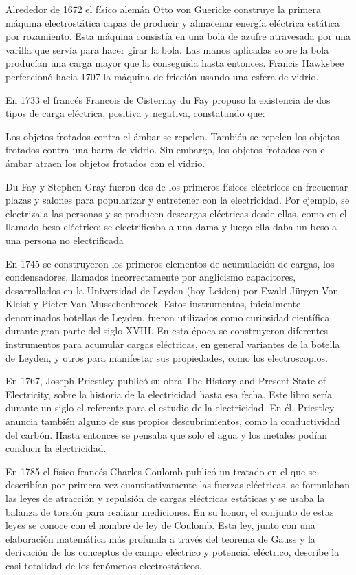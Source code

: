 Alrededor de 1672 el físico alemán Otto von Guericke construye la primera máquina electrostática capaz de producir y almacenar energía eléctrica estática por rozamiento. Esta máquina consistía en una bola de azufre atravesada por una varilla que servía para hacer girar la bola. Las manos aplicadas sobre la bola producían una carga mayor que la conseguida hasta entonces. Francis Hawksbee perfeccionó hacia 1707 la máquina de fricción usando una esfera de vidrio.

En 1733 el francés Francois de Cisternay du Fay propuso la existencia de dos tipos de carga eléctrica, positiva y negativa, constatando que:

Los objetos frotados contra el ámbar se repelen.
También se repelen los objetos frotados contra una barra de vidrio.
Sin embargo, los objetos frotados con el ámbar atraen los objetos frotados con el vidrio.

Du Fay y Stephen Gray fueron dos de los primeros físicos eléctricos en frecuentar plazas y salones para popularizar y entretener con la electricidad. Por ejemplo, se electriza a las personas y se producen descargas eléctricas desde ellas, como en el llamado beso eléctrico: se electrificaba a una dama y luego ella daba un beso a una persona no electrificada

En 1745 se construyeron los primeros elementos de acumulación de cargas, los condensadores, llamados incorrectamente por anglicismo capacitores, desarrollados en la Universidad de Leyden (hoy Leiden) por Ewald Jürgen Von Kleist y Pieter Van Musschenbroeck. Estos instrumentos, inicialmente denominados botellas de Leyden, fueron utilizados como curiosidad científica durante gran parte del siglo XVIII. En esta época se construyeron diferentes instrumentos para acumular cargas eléctricas, en general variantes de la botella de Leyden, y otros para manifestar sus propiedades, como los electroscopios.

En 1767, Joseph Priestley publicó su obra The History and Present State of Electricity, sobre la historia de la electricidad hasta esa fecha. Este libro sería durante un siglo el referente para el estudio de la electricidad. En él, Priestley anuncia también alguno de sus propios descubrimientos, como la conductividad del carbón. Hasta entonces se pensaba que solo el agua y los metales podían conducir la electricidad.

En 1785 el físico francés Charles Coulomb publicó un tratado en el que se describían por primera vez cuantitativamente las fuerzas eléctricas, se formulaban las leyes de atracción y repulsión de cargas eléctricas estáticas y se usaba la balanza de torsión para realizar mediciones. En su honor, el conjunto de estas leyes se conoce con el nombre de ley de Coulomb. Esta ley, junto con una elaboración matemática más profunda a través del teorema de Gauss y la derivación de los conceptos de campo eléctrico y potencial eléctrico, describe la casi totalidad de los fenómenos electrostáticos.

